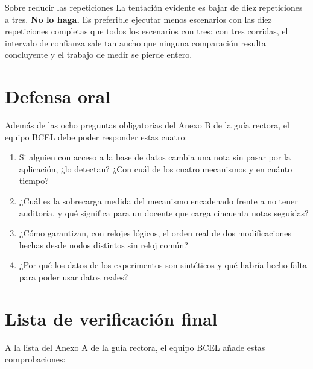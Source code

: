 \documentclass[11pt,a4paper]{article}
\begin{document}
\begin{avisoBox}{Sobre reducir las repeticiones}
	La tentación evidente es bajar de diez repeticiones a tres. \textbf{No lo haga.} Es preferible ejecutar menos escenarios con las diez repeticiones completas que todos los escenarios con tres: con tres corridas, el intervalo de confianza sale tan ancho que ninguna comparación resulta concluyente y el trabajo de medir se pierde entero.
\end{avisoBox}

\section{Defensa oral}

Además de las ocho preguntas obligatorias del Anexo B de la guía rectora, el equipo BCEL debe poder responder estas cuatro:

\begin{enumerate}[leftmargin=*,itemsep=3pt]
	\item Si alguien con acceso a la base de datos cambia una nota sin pasar por la aplicación, ¿lo detectan? ¿Con cuál de los cuatro mecanismos y en cuánto tiempo?
	\item ¿Cuál es la sobrecarga medida del mecanismo encadenado frente a no tener auditoría, y qué significa para un docente que carga cincuenta notas seguidas?
	\item ¿Cómo garantizan, con relojes lógicos, el orden real de dos modificaciones hechas desde nodos distintos sin reloj común?
	\item ¿Por qué los datos de los experimentos son sintéticos y qué habría hecho falta para poder usar datos reales?
\end{enumerate}

\section{Lista de verificación final}

A la lista del Anexo A de la guía rectora, el equipo BCEL añade estas comprobaciones:
\end{document}
